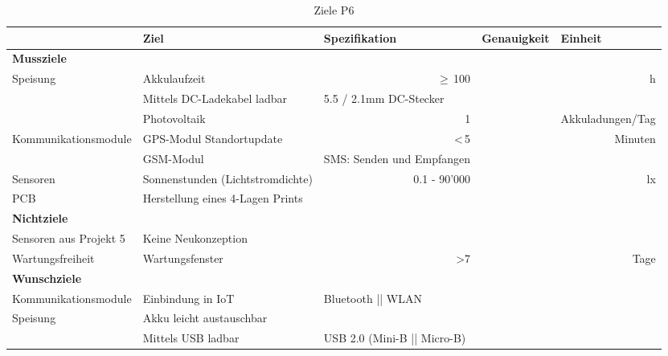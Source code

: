 \begin{landscape}
\begin{table}[h]
  \centering
  \renewcommand{\arraystretch}{1.1} %
  \caption{Ziele P6}
    \begin{tabular}{l|l|l|r|r}
          & \textbf{Ziel} & \multicolumn{1}{l|}{\textbf{Spezifikation}} & \multicolumn{1}{l|}{\textbf{Genauigkeit}} & \multicolumn{1}{l}{\textbf{Einheit}} \\
    \toprule
    \multicolumn{1}{l}{\textbf{Mussziele}} & \multicolumn{4}{r}{} \\
    \toprule
  \multirow{3}{*}{Speisung} & Akkulaufzeit & \multicolumn{1}{r|}{$\geq$\,100} &   & h \\
    \cline{2-5}  & Mittels DC-Ladekabel ladbar &      5.5 / 2.1mm DC-Stecker &       &  \\
	\cline{2-5}           & Photovoltaik &    \multicolumn{1}{r|}{1}   &       & Akkuladungen/Tag \\
    \hline
  \multirow{2}{*}{Kommunikationsmodule} & GPS-Modul Standortupdate   &  \multicolumn{1}{r|}{<\,5}  &       & Minuten \\
	\cline{2-5}          & GSM-Modul  & SMS: Senden und Empfangen &       &  \\
\hline
Sensoren & Sonnenstunden (Lichtstromdichte) & \multicolumn{1}{r|}{0.1 - 90'000} & & lx \\
\hline
PCB & Herstellung eines 4-Lagen Prints & & & \\
    \bottomrule
    \multicolumn{1}{l}{\textbf{Nichtziele}} & \multicolumn{4}{r}{} \\
    \toprule
     Sensoren aus Projekt 5& Keine Neukonzeption &  &  &  \\
     \hline
     Wartungsfreiheit & Wartungsfenster & \multicolumn{1}{r|}{>7} &  & Tage \\
    \bottomrule
    \multicolumn{1}{l}{\textbf{Wunschziele}} & \multicolumn{4}{r}{} \\
    \toprule
    Kommunikationsmodule & Einbindung in IoT &       Bluetooth || WLAN &       &  \\
    \hline
    \multirow{2}{*}{Speisung} & Akku leicht austauschbar &       &       &  \\
\cline{2-5}  & Mittels USB ladbar & USB 2.0 (Mini-B || Micro-B) &       &  \\

    \bottomrule
    \end{tabular}%
  \label{tab:ZieleP6}%
\end{table}%


\end{landscape}
